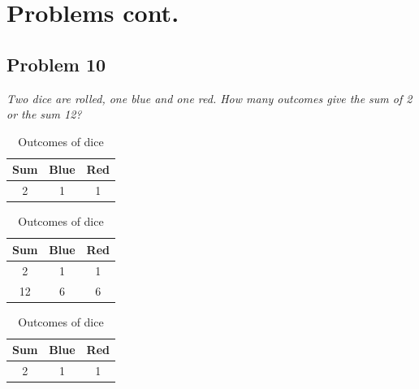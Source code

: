 \documentclass[handout]{beamer}
\begin{document}
        
\section{Problems cont.}

                
        
    \subsection{Problem 10}
    
        \begin{frame}[c,shrink]{\subsecname}
            \textit{Two dice are rolled, one blue and one red. How many outcomes give the sum of
2 or the sum 12?}
            \begin{overprint}
            \begin{table}[tp]%
                \caption{Outcomes of dice}
                \label{dicetable1}\centering%
                \begin{tabular}{ccc}
                    \hline%
                      Sum 	& Blue  & Red 	\\\hline%
                     2 	& 1	   & 1 	\\\hline%
                \end{tabular}
            \end{table}
            \begin{table}[tp]%
                \caption{Outcomes of dice}
                \label{dicetable2}\centering%
                \begin{tabular}{ccc}
                    \hline%
                      Sum 	& Blue  & Red 	\\\hline%
                     2 	& 1	   & 1 	\\\hline
                     12 	& 6	   & 6 	\\\hline%
                \end{tabular}
            \end{table}
            \begin{table}[tp]%
                \caption{Outcomes of dice}
                \label{dicetable3}\centering%
                \begin{tabular}{ccc}
                    \hline%
                      Sum 	& Blue  & Red 	\\\hline%
                     2 	& 1	   & 1 	\\\hline

\end{tabular}
\end{table}
\end{overprint}
\end{frame}
\end{document}
